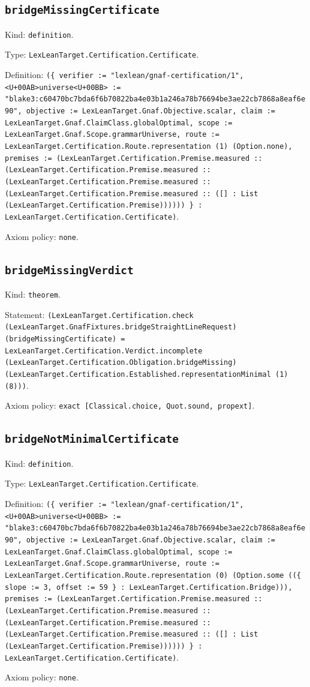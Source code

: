 \documentclass[11pt]{article}
\begin{document}
\subsection*{\texttt{bridgeMissingCertificate}}
\noindent Kind: \texttt{definition}.\par
\noindent Type: \texttt{LexLeanTarget.Certification.Certificate}.\par
\noindent Definition: \texttt{(\{ verifier := "lexlean/gnaf-certification/1", <U+00AB>universe<U+00BB> := "blake3:c60470bc7bda6f6b70822ba4e03b1a246a78b76694be3ae22cb7868a8eaf6e90", objective := LexLeanTarget.Gnaf.Objective.scalar, claim := LexLeanTarget.Gnaf.ClaimClass.globalOptimal, scope := LexLeanTarget.Gnaf.Scope.grammarUniverse, route := LexLeanTarget.Certification.Route.representation (1) (Option.none), premises := (LexLeanTarget.Certification.Premise.measured :: (LexLeanTarget.Certification.Premise.measured :: (LexLeanTarget.Certification.Premise.measured :: (LexLeanTarget.Certification.Premise.measured :: ([] : List (LexLeanTarget.Certification.Premise)))))) \} : LexLeanTarget.Certification.Certificate)}.\par
\noindent Axiom policy: \texttt{none}.\par
\subsection*{\texttt{bridgeMissingVerdict}}
\noindent Kind: \texttt{theorem}.\par
\noindent Statement: \texttt{(LexLeanTarget.Certification.check (LexLeanTarget.GnafFixtures.bridgeStraightLineRequest) (bridgeMissingCertificate) = LexLeanTarget.Certification.Verdict.incomplete (LexLeanTarget.Certification.Obligation.bridgeMissing) (LexLeanTarget.Certification.Established.representationMinimal (1) (8)))}.\par
\noindent Axiom policy: \texttt{exact [Classical.choice, Quot.sound, propext]}.\par
\subsection*{\texttt{bridgeNotMinimalCertificate}}
\noindent Kind: \texttt{definition}.\par
\noindent Type: \texttt{LexLeanTarget.Certification.Certificate}.\par
\noindent Definition: \texttt{(\{ verifier := "lexlean/gnaf-certification/1", <U+00AB>universe<U+00BB> := "blake3:c60470bc7bda6f6b70822ba4e03b1a246a78b76694be3ae22cb7868a8eaf6e90", objective := LexLeanTarget.Gnaf.Objective.scalar, claim := LexLeanTarget.Gnaf.ClaimClass.globalOptimal, scope := LexLeanTarget.Gnaf.Scope.grammarUniverse, route := LexLeanTarget.Certification.Route.representation (0) (Option.some ((\{ slope := 3, offset := 59 \} : LexLeanTarget.Certification.Bridge))), premises := (LexLeanTarget.Certification.Premise.measured :: (LexLeanTarget.Certification.Premise.measured :: (LexLeanTarget.Certification.Premise.measured :: (LexLeanTarget.Certification.Premise.measured :: ([] : List (LexLeanTarget.Certification.Premise)))))) \} : LexLeanTarget.Certification.Certificate)}.\par
\noindent Axiom policy: \texttt{none}.\par
\end{document}
